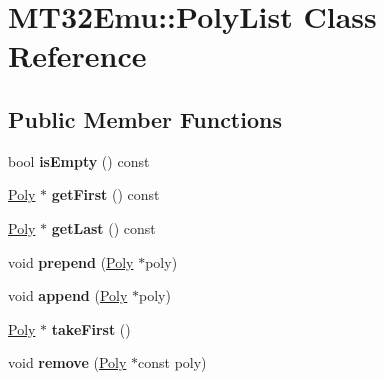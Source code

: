 \hypertarget{classMT32Emu_1_1PolyList}{\section{M\-T32\-Emu\-:\-:Poly\-List Class Reference}
\label{classMT32Emu_1_1PolyList}
}
\subsection*{Public Member Functions}
\begin{DoxyCompactItemize}
\item 
\hypertarget{classMT32Emu_1_1PolyList_a7fc92d093c4700846b65d0877779fb84}{bool {\bfseries is\-Empty} () const }\label{classMT32Emu_1_1PolyList_a7fc92d093c4700846b65d0877779fb84}

\item 
\hypertarget{classMT32Emu_1_1PolyList_a95f9ea79fdaa4fb59b2b5f488d5473eb}{\hyperlink{classMT32Emu_1_1Poly}{Poly} $\ast$ {\bfseries get\-First} () const }\label{classMT32Emu_1_1PolyList_a95f9ea79fdaa4fb59b2b5f488d5473eb}

\item 
\hypertarget{classMT32Emu_1_1PolyList_a701f2c15d53f9d6736f1213dbbab9224}{\hyperlink{classMT32Emu_1_1Poly}{Poly} $\ast$ {\bfseries get\-Last} () const }\label{classMT32Emu_1_1PolyList_a701f2c15d53f9d6736f1213dbbab9224}

\item 
\hypertarget{classMT32Emu_1_1PolyList_a0f6407a487b79dc1dcc0b810f0f32b31}{void {\bfseries prepend} (\hyperlink{classMT32Emu_1_1Poly}{Poly} $\ast$poly)}\label{classMT32Emu_1_1PolyList_a0f6407a487b79dc1dcc0b810f0f32b31}

\item 
\hypertarget{classMT32Emu_1_1PolyList_a6cb33bdab9d0146a3baff5a6feae9e5a}{void {\bfseries append} (\hyperlink{classMT32Emu_1_1Poly}{Poly} $\ast$poly)}\label{classMT32Emu_1_1PolyList_a6cb33bdab9d0146a3baff5a6feae9e5a}

\item 
\hypertarget{classMT32Emu_1_1PolyList_a05b7549d097f22041dff5213589ee49d}{\hyperlink{classMT32Emu_1_1Poly}{Poly} $\ast$ {\bfseries take\-First} ()}\label{classMT32Emu_1_1PolyList_a05b7549d097f22041dff5213589ee49d}

\item 
\hypertarget{classMT32Emu_1_1PolyList_acf0fe25e3a4a97b4a0cf4d481f51299a}{void {\bfseries remove} (\hyperlink{classMT32Emu_1_1Poly}{Poly} $\ast$const poly)}\label{classMT32Emu_1_1PolyList_acf0fe25e3a4a97b4a0cf4d481f51299a}

\end{DoxyCompactItemize}

